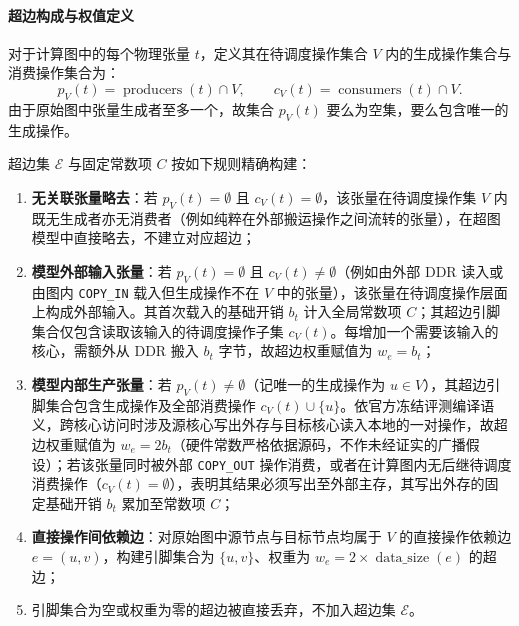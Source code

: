 \documentclass[anonymous,withtoc]{gmcm2026}
\providecommand{\tightlist}{\setlength{\itemsep}{0pt}\setlength{\parskip}{0pt}}
\begin{document}
\paragraph{超边构成与权值定义}

对于计算图中的每个物理张量 \(t\)，定义其在待调度操作集合 \(V\) 内的生成操作集合与消费操作集合为： \begin{equation}
p_V(t) = \operatorname{producers}(t) \cap V, \qquad c_V(t) = \operatorname{consumers}(t) \cap V.
\end{equation} 由于原始图中张量生成者至多一个，故集合 \(p_V(t)\) 要么为空集，要么包含唯一的生成操作。

超边集 \(\mathcal{E}\) 与固定常数项 \(C\) 按如下规则精确构建：

\begin{enumerate}
\def\labelenumi{\arabic{enumi}.}
\tightlist
\item
  \textbf{无关联张量略去}：若 \(p_V(t) = \emptyset\) 且 \(c_V(t) = \emptyset\)，该张量在待调度操作集 \(V\) 内既无生成者亦无消费者（例如纯粹在外部搬运操作之间流转的张量），在超图模型中直接略去，不建立对应超边；
\item
  \textbf{模型外部输入张量}：若 \(p_V(t) = \emptyset\) 且 \(c_V(t) \ne \emptyset\)（例如由外部 DDR 读入或由图内 \texttt{COPY\_IN} 载入但生成操作不在 \(V\) 中的张量），该张量在待调度操作层面上构成外部输入。其首次载入的基础开销 \(b_t\) 计入全局常数项 \(C\)；其超边引脚集合仅包含读取该输入的待调度操作子集 \(c_V(t)\)。每增加一个需要该输入的核心，需额外从 DDR 搬入 \(b_t\) 字节，故超边权重赋值为 \(w_e = b_t\)；
\item
  \textbf{模型内部生产张量}：若 \(p_V(t) \ne \emptyset\)（记唯一的生成操作为 \(u \in V\)），其超边引脚集合包含生成操作及全部消费操作 \(c_V(t) \cup \{u\}\)。依官方冻结评测编译语义，跨核心访问时涉及源核心写出外存与目标核心读入本地的一对操作，故超边权重赋值为 \(w_e = 2b_t\)（硬件常数严格依据源码，不作未经证实的广播假设）；若该张量同时被外部 \texttt{COPY\_OUT} 操作消费，或者在计算图内无后继待调度消费操作（\(c_V(t) = \emptyset\)），表明其结果必须写出至外部主存，其写出外存的固定基础开销 \(b_t\) 累加至常数项 \(C\)；
\item
  \textbf{直接操作间依赖边}：对原始图中源节点与目标节点均属于 \(V\) 的直接操作依赖边 \(e = (u, v)\)，构建引脚集合为 \(\{u, v\}\)、权重为 \(w_e = 2 \times \operatorname{data\_size}(e)\) 的超边；
\item
  引脚集合为空或权重为零的超边被直接丢弃，不加入超边集 \(\mathcal{E}\)。
\end{enumerate}
\end{document}

